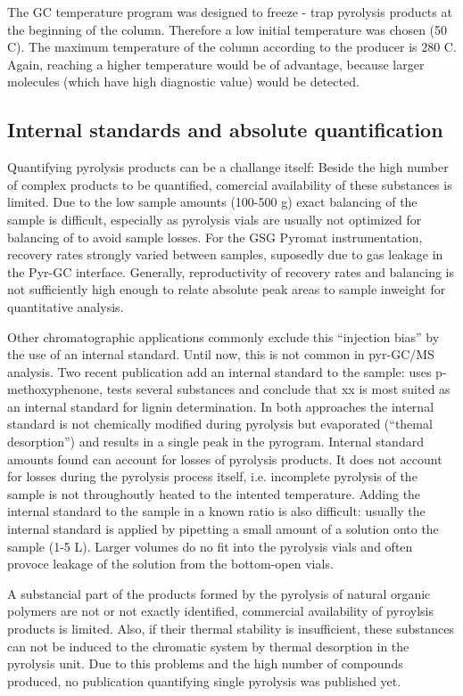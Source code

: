 The GC temperature program was designed to freeze - trap pyrolysis products at the beginning of the column. Therefore a low initial temperature was chosen (50 \textdegree C). The maximum temperature of the column according to the producer is 280 \textdegree C. Again, reaching a higher temperature would be of advantage, because larger molecules (which have high diagnostic value) would be detected.

\subsection{Internal standards and absolute quantification}

Quantifying pyrolysis products can be a challange itself: Beside the high number of complex products to be quantified, comercial availability of these substances is limited. Due to the low sample amounts (100-500 \textmu g) exact balancing of the sample is difficult, especially as pyrolysis vials are usually not optimized for balancing of to avoid sample losses. For the GSG Pyromat instrumentation, recovery rates strongly varied between samples, suposedly due to gas leakage in the Pyr-GC interface. Generally, reproductivity of recovery rates and balancing is not sufficiently high enough to relate absolute peak areas to sample inweight for quantitative analysis. 

Other chromatographic applications commonly exclude this ``injection bias'' by the use of an internal standard. Until now, this is not common in pyr-GC/MS analysis. Two recent publication add an internal standard to the sample: \cite{Steinbeiss2006} uses p-methoxyphenone, \cite{Bocchini1997} tests several substances and conclude that xx is most suited as an internal standard for lignin determination. In both approaches the internal standard is not chemically modified during pyrolysis but evaporated (``themal desorption'') and results in a single peak in the pyrogram. Internal standard amounts found can account for losses of pyrolysis products. It does not account for losses during the pyrolysis process itself, i.e. incomplete pyrolysis of the sample is not throughoutly heated to the intented temperature. Adding the internal standard to the sample in a known ratio is also difficult: usually the internal standard is applied by pipetting a small amount of a solution onto the sample (1-5 \textmu L). Larger volumes do no fit into the pyrolysis vials and often provoce leakage of the solution from the bottom-open vials.

A substancial part of the products formed by the pyrolysis of natural organic polymers are not or not exactly identified, commercial availability of pyroylsis products is limited. Also, if their thermal stability is insufficient, these substances can not be induced to the chromatic system by thermal desorption in the pyrolysis unit. Due to this problems and the high number of compounds produced, no publication quantifying single pyrolysis was published yet.

